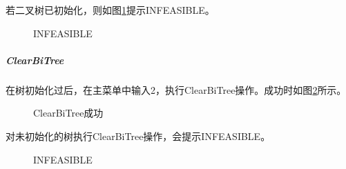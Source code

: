 \documentclass[supercite]{Experimental_Report}
\theoremstyle{definition}
\begin{document}
\noindent
若二叉树已初始化，则如图\ref{fig5-5}提示INFEASIBLE。
\begin{figure}[htbp]
	\centering
	\centering
	\caption{INFEASIBLE}
	\label{fig5-5}
\end{figure}

\clearpage
\subparagraph{ClearBiTree}
\noindent
在树初始化过后，在主菜单中输入2，执行ClearBiTree操作。成功时如图\ref{fig5-6}所示。
\begin{figure}[htbp]
	\centering
	\centering
	\caption{ClearBiTree成功}
	\label{fig5-6}
\end{figure}

\noindent
对未初始化的树执行ClearBiTree操作，会提示INFEASIBLE。
\begin{figure}[htbp]
	\centering
	\centering
	\caption{INFEASIBLE}
	\label{fig5-7}
\end{figure}
\end{document}
